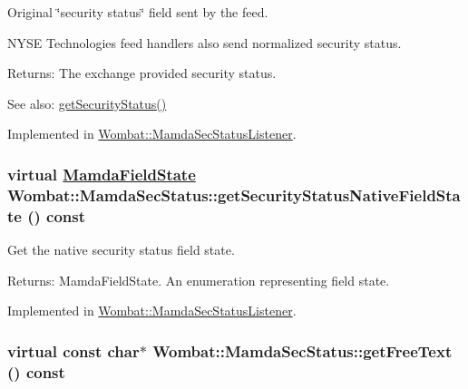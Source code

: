 Original \char`\"{}security status\char`\"{} field sent by the feed. 

NYSE Technologies feed handlers also send normalized security status.

\begin{Desc}
\item[Returns:]The exchange provided security status. \end{Desc}
\begin{Desc}
\item[See also:]\hyperlink{classWombat_1_1MamdaSecStatus_ea108ad9235e4c39c8f5474cbb6c003f}{get\-Security\-Status()} \end{Desc}


Implemented in \hyperlink{classWombat_1_1MamdaSecStatusListener_9f8513907a453b1f2e5b7fad4f6c8b01}{Wombat::Mamda\-Sec\-Status\-Listener}.\hypertarget{classWombat_1_1MamdaSecStatus_e12cf50355eda32ff167910636c5629f}{
\subsubsection[getSecurityStatusNativeFieldState]{\setlength{\rightskip}{0pt plus 5cm}virtual \hyperlink{namespaceWombat_93aac974f2ab713554fd12a1fa3b7d2a}{Mamda\-Field\-State} Wombat::Mamda\-Sec\-Status::get\-Security\-Status\-Native\-Field\-State () const}}
\label{classWombat_1_1MamdaSecStatus_e12cf50355eda32ff167910636c5629f}


Get the native security status field state. 

\begin{Desc}
\item[Returns:]Mamda\-Field\-State. An enumeration representing field state. \end{Desc}


Implemented in \hyperlink{classWombat_1_1MamdaSecStatusListener_6ceb039c9b33e50e458383e108670f67}{Wombat::Mamda\-Sec\-Status\-Listener}.\hypertarget{classWombat_1_1MamdaSecStatus_df2540961aed13114c3799839d59d975}{
\subsubsection[getFreeText]{\setlength{\rightskip}{0pt plus 5cm}virtual const char$\ast$ Wombat::Mamda\-Sec\-Status::get\-Free\-Text () const}}
\label{classWombat_1_1MamdaSecStatus_df2540961aed13114c3799839d59d975}


